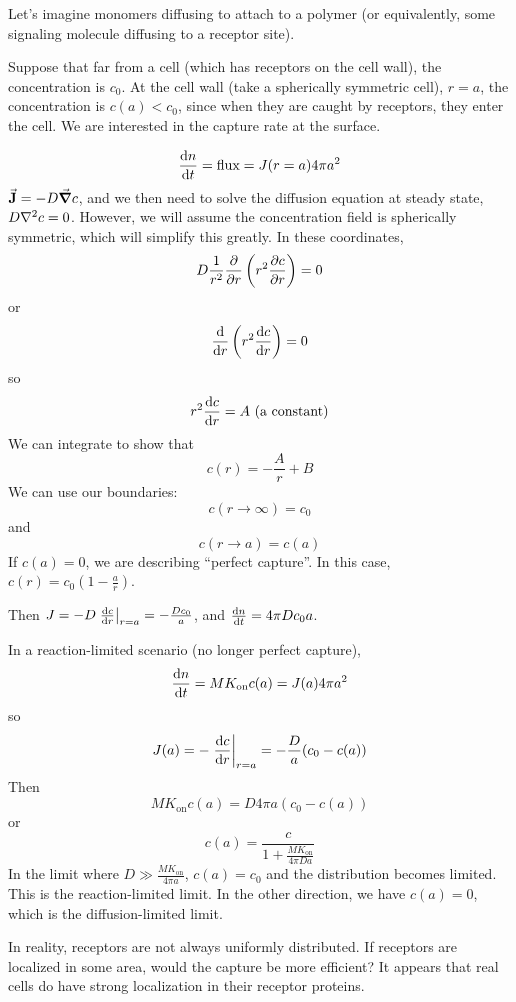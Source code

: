 \documentclass[a4paper,twoside,master.tex]{subfiles}
\begin{document}
Let's imagine monomers diffusing to attach to a polymer (or equivalently, some signaling molecule diffusing to a receptor site).

Suppose that far from a cell (which has receptors on the cell wall), the concentration is $ c_0 $. At the cell wall (take a spherically symmetric cell), $ r = a $, the concentration is $ c(a) < c_0 $, since when they are caught by receptors, they enter the cell. We are interested in the capture rate at the surface.

\begin{equation}
    \dv{n}{t} = \text{flux} = J(r = a) 4 \pi a^2
\end{equation}
$ \va{J} = - D \grad{c} $, and we then need to solve the diffusion equation at steady state, $ D \laplacian{c} = 0 $. However, we will assume the concentration field is spherically symmetric, which will simplify this greatly. In these coordinates,
\begin{equation}
    D\frac{1}{r^2} \pdv{r} \left( r^2 \pdv{c}{r} \right) = 0
\end{equation}
or
\begin{equation}
    \dv{r}\left( r^2 \dv{c}{r} \right) = 0
\end{equation}
so
\begin{equation}
    r^2 \dv{c}{r} = A \text{ (a constant)}
\end{equation}
We can integrate to show that
\begin{equation}
    c(r) = - \frac{A}{r} + B
\end{equation}
We can use our boundaries:
\begin{equation}
    c(r \to \infty) = c_0
\end{equation}
and
\begin{equation}
    c(r \to a) = c(a)
\end{equation}
If $ c(a) = 0 $, we are describing ``perfect capture''. In this case, $ c(r) = c_0 \left( 1 - \frac{a}{r} \right) $.

Then $ J = - D \eval{\dv{c}{r}}_{r=a} = - \frac{D c_0}{a} $, and $ \dv{n}{t} = 4 \pi D c_0 a $.

In a reaction-limited scenario (no longer perfect capture),
\begin{equation}
    \dv{n}{t} = M K_{\text{on}} c(a) = J(a) 4 \pi a^2
\end{equation}
so
\begin{equation}
    J(a) = - \eval{\dv{c}{r}}_{r=a} = - \frac{D}{a} (c_0 - c(a))
\end{equation}
Then
\begin{equation}
    M K_{\text{on}} c(a) = D 4 \pi a (c_0 - c(a))
\end{equation}
or
\begin{equation}
    c(a) = \frac{c}{1 + \frac{M K_{\text{on}}}{4 \pi D a}}
\end{equation}
In the limit where $ D \gg \frac{M K_{\text{on}}}{4 \pi a} $, $ c(a) = c_0 $ and the distribution becomes limited. This is the reaction-limited limit. In the other direction, we have $ c(a) = 0 $, which is the diffusion-limited limit.

In reality, receptors are not always uniformly distributed. If receptors are localized in some area, would the capture be more efficient? It appears that real cells do have strong localization in their receptor proteins.
\end{document}
